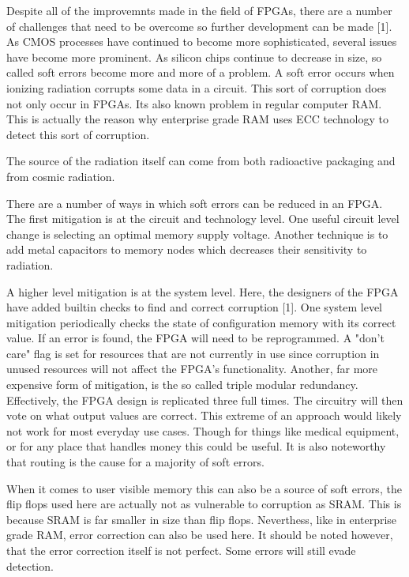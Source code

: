 \documentclass{article}
\begin{document}
    Despite all of the improvemnts made in the field of FPGAs, there are a number of challenges
    that need to be overcome so further development can be made [1]. As CMOS processes
    have continued to become more sophisticated, several issues have become more prominent.
    As silicon chips continue to decrease in size, so called soft errors become more and more
    of a problem. A soft error occurs when ionizing radiation corrupts some data in a circuit.
    This sort of corruption does not only occur in FPGAs. Its also known problem in
    regular computer RAM. This is actually the reason why enterprise grade RAM uses
    ECC technology to detect this sort of corruption.

    The source of the radiation itself can come from both radioactive packaging and
    from cosmic radiation.

    There are a number of ways in which soft errors can be reduced in an FPGA.
    The first mitigation is at the circuit and technology level.
    One useful circuit level change is selecting an optimal memory supply voltage.
    Another technique is to add metal capacitors to memory nodes which
    decreases their sensitivity to radiation.


    A higher level mitigation is at the system level. Here, the designers of the FPGA have added builtin checks
    to find and correct corruption [1].
    One system level mitigation periodically checks the state of configuration memory
    with its correct value. If an error is found, the FPGA will need to be reprogrammed.
    A "don't care" flag is set for resources that are not currently in use since
    corruption in unused resources will not affect the FPGA's functionality.
    Another, far more expensive form of mitigation, is the so called triple modular
    redundancy. Effectively, the FPGA design is replicated three full times.
    The circuitry will then vote on what output values are correct.
    This extreme of an approach would likely not work for most everyday use cases.
    Though for things like medical equipment, or for any place that handles money this
    could be useful.
    It is also noteworthy that routing is the cause for a majority of soft errors.

    When it comes to user visible memory this can also be a source of soft errors,
    the flip flops used here are actually not as vulnerable to corruption as SRAM.
    This is because SRAM is far smaller in size than flip flops. Neverthess,
    like in enterprise grade RAM, error correction can also be used here.
    It should be noted however, that the error correction itself is not perfect. Some
    errors will still evade detection.
\end{document}
